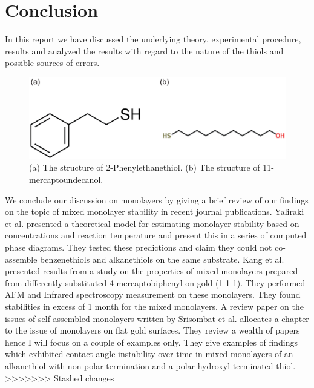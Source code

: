 \section{Conclusion}

In this report we have discussed the underlying theory, experimental procedure, results and analyzed the results with regard to the nature of the thiols and possible sources of errors.



\begin{figure}[h]
\centering
\includegraphics[width=0.9\columnwidth]{11mer.eps}
\caption{(a) The structure of 2-Phenylethanethiol. (b) The structure of 11-mercaptoundecanol. }
\label{11mer}
\end{figure}

We conclude our discussion on monolayers by giving a brief review of our findings on the topic of mixed monolayer stability in recent journal publications.
Yaliraki et al. presented a theoretical model for estimating monolayer stability based on concentrations and reaction temperature and present this in a series of computed phase diagrams. They tested these predictions and claim they could not co-assemble benzenethiols and alkanethiols on the same substrate. \cite{yaliraki}
Kang et al. presented results from a study on the properties of mixed monolayers prepared from differently substituted 4-mercaptobiphenyl on gold (1 1 1). They performed AFM and Infrared spectroscopy measurement on these monolayers. They found stabilities in excess of 1 month for the mixed monolayers. \cite{kang}
A review paper on the issues of self-assembled monolayers written by Srisombat et al. allocates a chapter to the issue of monolayers on flat gold surfaces. They review a wealth of papers hence I will focus on a couple of examples only. They give examples of findings which exhibited contact angle instability over time in mixed monolayers of an alkanethiol with non-polar termination and a polar hydroxyl terminated thiol. \cite{srisombat}
>>>>>>> Stashed changes
